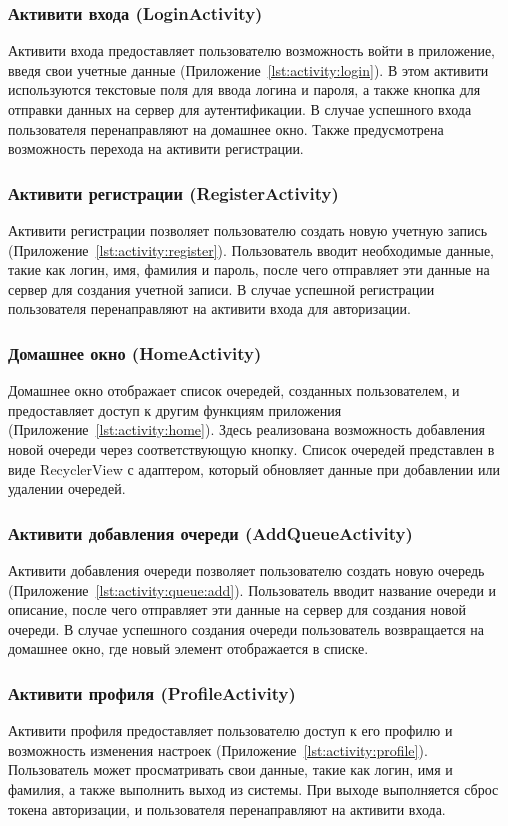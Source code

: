 \subsubsection{Активити входа (LoginActivity)}
Активити входа предоставляет пользователю возможность войти
в приложение, введя свои учетные данные (Приложение~\ref{lst:activity:login}).
В этом активити используются текстовые поля для ввода логина и пароля,
а также кнопка для отправки данных на сервер для аутентификации.
В случае успешного входа пользователя перенаправляют на домашнее окно.
Также предусмотрена возможность перехода на активити регистрации.

\subsubsection{Активити регистрации (RegisterActivity)}
Активити регистрации позволяет пользователю создать новую учетную запись
(Приложение~\ref{lst:activity:register}).
Пользователь вводит необходимые данные, такие как логин, имя, фамилия и пароль,
после чего отправляет эти данные на сервер для создания учетной записи.
В случае успешной регистрации пользователя перенаправляют на активити входа
для авторизации.

\subsubsection{Домашнее окно (HomeActivity)}
Домашнее окно отображает список очередей, созданных пользователем,
и предоставляет доступ к другим функциям приложения
(Приложение~\ref{lst:activity:home}).
Здесь реализована возможность добавления новой очереди
через соответствующую кнопку. Список очередей представлен в виде RecyclerView
с адаптером, который обновляет данные при добавлении или удалении очередей.

\subsubsection{Активити добавления очереди (AddQueueActivity)}
Активити добавления очереди позволяет пользователю создать новую очередь
(Приложение~\ref{lst:activity:queue:add}).
Пользователь вводит название очереди и описание,
после чего отправляет эти данные на сервер для создания новой очереди.
В случае успешного создания очереди пользователь возвращается на домашнее окно,
где новый элемент отображается в списке.

\subsubsection{Активити профиля (ProfileActivity)}
Активити профиля предоставляет пользователю доступ к его профилю
и возможность изменения настроек (Приложение~\ref{lst:activity:profile}).
Пользователь может просматривать свои данные,
такие как логин, имя и фамилия, а также выполнить выход из системы.
При выходе выполняется сброс токена авторизации,
и пользователя перенаправляют на активити входа.

